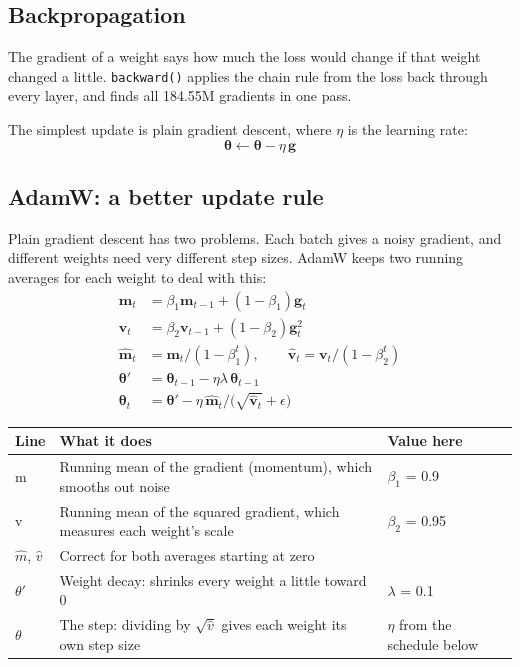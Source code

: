 \documentclass[11pt,a4paper]{article}
\newcommand{\code}[1]{\texttt{#1}}
\begin{document}
\subsection*{Backpropagation}
{}

The gradient of a weight says how much the loss would change if that weight changed a little. \code{backward()} applies the chain rule from the loss back through every layer, and finds all 184.55M gradients in one pass.

The simplest update is plain gradient descent, where $\eta$ is the learning rate:
\[
\boldsymbol{\theta} \leftarrow \boldsymbol{\theta} - \eta\,\mathbf{g}
\]

\subsection*{AdamW: a better update rule}
{}

Plain gradient descent has two problems. Each batch gives a noisy gradient, and different weights need very different step sizes. AdamW keeps two running averages for each weight to deal with this:
\[
\begin{aligned}
\mathbf{m}_t &= \beta_1\mathbf{m}_{t-1}+(1-\beta_1)\mathbf{g}_t\\
\mathbf{v}_t &= \beta_2\mathbf{v}_{t-1}+(1-\beta_2)\mathbf{g}_t^2\\
\hat{\mathbf{m}}_t &= \mathbf{m}_t/(1-\beta_1^t),\qquad \hat{\mathbf{v}}_t = \mathbf{v}_t/(1-\beta_2^t)\\
\boldsymbol{\theta}' &= \boldsymbol{\theta}_{t-1}-\eta\lambda\,\boldsymbol{\theta}_{t-1}\\
\boldsymbol{\theta}_t &= \boldsymbol{\theta}'-\eta\,\hat{\mathbf{m}}_t\big/\big(\sqrt{\hat{\mathbf{v}}_t}+\epsilon\big)
\end{aligned}
\]

{\small
\begin{longtable}{@{}>{\raggedright\arraybackslash}p{}>{\raggedright\arraybackslash}p{}>{\raggedright\arraybackslash}p{}@{}}
\toprule
\textbf{Line} & \textbf{What it does} & \textbf{Value here} \\
\midrule
\endhead
m & Running mean of the gradient (momentum), which smooths out noise & $\beta_1$ = 0.9 \\
v & Running mean of the squared gradient, which measures each weight's scale & $\beta_2$ = 0.95 \\
$\hat{m}$, $\hat{v}$ & Correct for both averages starting at zero &  \\
$\theta'$ & Weight decay: shrinks every weight a little toward 0 & $\lambda$ = 0.1 \\
$\theta$ & The step: dividing by $\sqrt{\hat{v}}$ gives each weight its own step size & $\eta$ from the schedule below \\
\bottomrule
\end{longtable}
}
\end{document}
